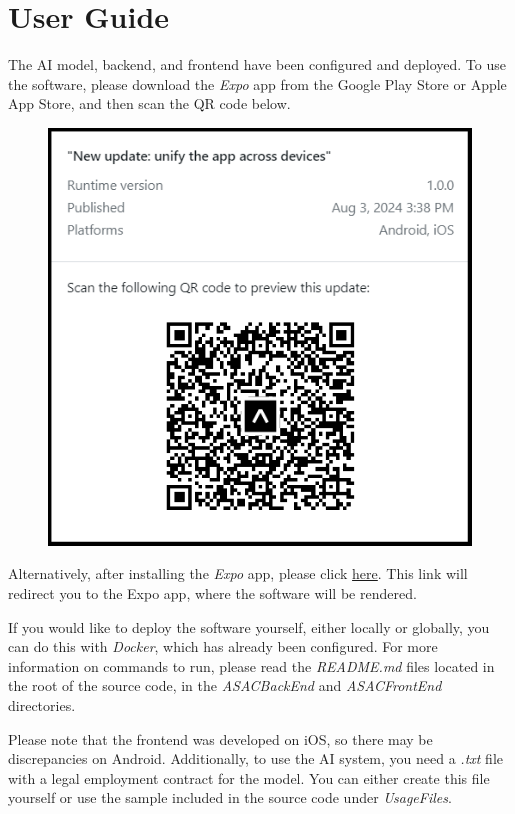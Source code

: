 \chapter{User Guide}

The AI model, backend, and frontend have been configured and deployed. To use the software, please download the \textit{Expo} app from the Google Play Store or Apple App Store, and then scan the QR code below.

\begin{figure}[!ht]
    \centering
    \includegraphics[width=0.5\linewidth]{LATEX/Appendices/Images/Software/deployed-app-qr-code.png}
    
    \label{fig:deployed-app-qr-codel}
\end{figure}

Alternatively, after installing the \textit{Expo} app, please click \href{https://expo.dev/preview/update?message=New\%20update\%3A\%20unify\%20the\%20app\%20across\%20devices&updateRuntimeVersion=1.0.0&createdAt=2024-08-03T14\%3A38\%3A52.572Z&slug=exp&projectId=032f6af8-bb36-47b5-80a0-f6f070705b75&group=e0b07c3c-0576-44ea-be88-aef4dbfc942a}{here}. This link will redirect you to the Expo app, where the software will be rendered.

If you would like to deploy the software yourself, either locally or globally, you can do this with \textit{Docker}, which has already been configured. For more information on commands to run, please read the \textit{README.md} files located in the root of the source code, in the \textit{ASACBackEnd} and \textit{ASACFrontEnd} directories.

Please note that the frontend was developed on iOS, so there may be discrepancies on Android. Additionally, to use the AI system, you need a \textit{.txt} file with a legal employment contract for the model. You can either create this file yourself or use the sample included in the source code under \textit{UsageFiles}.


